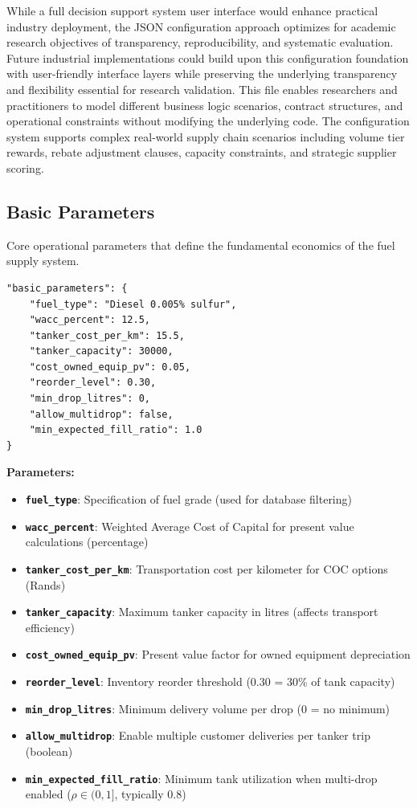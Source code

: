 While a full decision support system user interface would enhance practical industry deployment, the JSON configuration approach optimizes for academic research objectives of transparency, reproducibility, and systematic evaluation. Future industrial implementations could build upon this configuration foundation with user-friendly interface layers while preserving the underlying transparency and flexibility essential for research validation. This file enables researchers and practitioners to model different business logic scenarios, contract structures, and operational constraints without modifying the underlying code. The configuration system supports complex real-world supply chain scenarios including volume tier rewards, rebate adjustment clauses, capacity constraints, and strategic supplier scoring.

\subsection{Basic Parameters}
Core operational parameters that define the fundamental economics of the fuel supply system.

\begin{verbatim}
"basic_parameters": {
    "fuel_type": "Diesel 0.005% sulfur",
    "wacc_percent": 12.5,
    "tanker_cost_per_km": 15.5,
    "tanker_capacity": 30000,
    "cost_owned_equip_pv": 0.05,
    "reorder_level": 0.30,
    "min_drop_litres": 0,
    "allow_multidrop": false,
    "min_expected_fill_ratio": 1.0
}
\end{verbatim}

\textbf{Parameters:}
\begin{itemize}
    \item \textbf{\texttt{fuel\_type}}: Specification of fuel grade (used for database filtering)
    \item \textbf{\texttt{wacc\_percent}}: Weighted Average Cost of Capital for present value calculations (percentage)
    \item \textbf{\texttt{tanker\_cost\_per\_km}}: Transportation cost per kilometer for COC options (Rands)
    \item \textbf{\texttt{tanker\_capacity}}: Maximum tanker capacity in litres (affects transport efficiency)
    \item \textbf{\texttt{cost\_owned\_equip\_pv}}: Present value factor for owned equipment depreciation
    \item \textbf{\texttt{reorder\_level}}: Inventory reorder threshold (0.30 = 30\% of tank capacity)
    \item \textbf{\texttt{min\_drop\_litres}}: Minimum delivery volume per drop (0 = no minimum)
    \item \textbf{\texttt{allow\_multidrop}}: Enable multiple customer deliveries per tanker trip (boolean)
    \item \textbf{\texttt{min\_expected\_fill\_ratio}}: Minimum tank utilization when multi-drop enabled ($\rho \in (0,1]$, typically 0.8)
\end{itemize}

